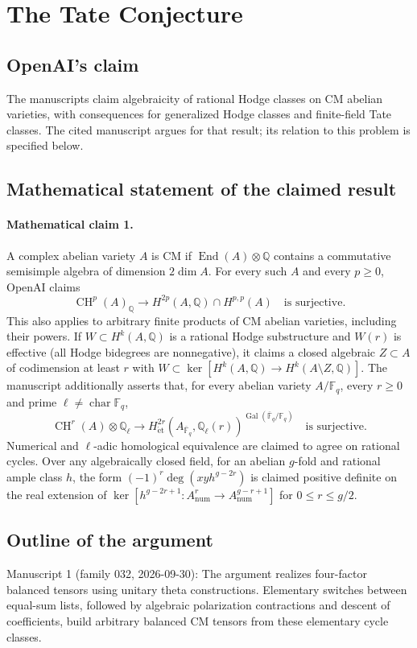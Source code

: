\documentclass[11pt]{article}
\begin{document}
\section*{The Tate Conjecture}

\subsection{OpenAI's claim}
The manuscripts claim algebraicity of rational Hodge classes on CM abelian varieties, with consequences for generalized Hodge classes and finite-field Tate classes. The cited manuscript argues for that result; its relation to this problem is specified below.

\subsection{Mathematical statement of the claimed result}
\paragraph{Mathematical claim 1.} A complex abelian variety $A$ is CM if $\operatorname{End}(A)\otimes\mathbb Q$ contains a commutative semisimple algebra of dimension $2\dim A$. For every such $A$ and every $p\ge0$, OpenAI claims
\[
\operatorname{CH}^p(A)_{\mathbb Q}\longrightarrow H^{2p}(A,\mathbb Q)\cap H^{p,p}(A)
\quad\text{is surjective}.
\]
This also applies to arbitrary finite products of CM abelian varieties, including their powers. If $W\subset H^k(A,\mathbb Q)$ is a rational Hodge substructure and $W(r)$ is effective (all Hodge bidegrees are nonnegative), it claims a closed algebraic $Z\subset A$ of codimension at least $r$ with $W\subset\ker[H^k(A,\mathbb Q)\to H^k(A\setminus Z,\mathbb Q)]$.
The manuscript additionally asserts that, for every abelian variety $A/\mathbb F_q$, every $r\ge0$ and prime $\ell\ne\operatorname{char}\mathbb F_q$,
\[
\operatorname{CH}^r(A)\otimes\mathbb Q_\ell\longrightarrow
H^{2r}_{\mathrm{\acute et}}(A_{\overline{\mathbb F}_q},\mathbb Q_\ell(r))^{\operatorname{Gal}(\overline{\mathbb F}_q/\mathbb F_q)}
\quad\text{is surjective}.
\]
Numerical and $\ell$-adic homological equivalence are claimed to agree on rational cycles. Over any algebraically closed field, for an abelian $g$-fold and rational ample class $h$, the form $(-1)^r\deg(xyh^{g-2r})$ is claimed positive definite on the real extension of $\ker[h^{g-2r+1}:A^r_{\mathrm{num}}\to A^{g-r+1}_{\mathrm{num}}]$ for $0\le r\le g/2$.

\subsection{Outline of the argument}
Manuscript 1 (family 032, 2026-09-30): The argument realizes four-factor balanced tensors using unitary theta constructions. Elementary switches between equal-sum lists, followed by algebraic polarization contractions and descent of coefficients, build arbitrary balanced CM tensors from these elementary cycle classes.
\end{document}
